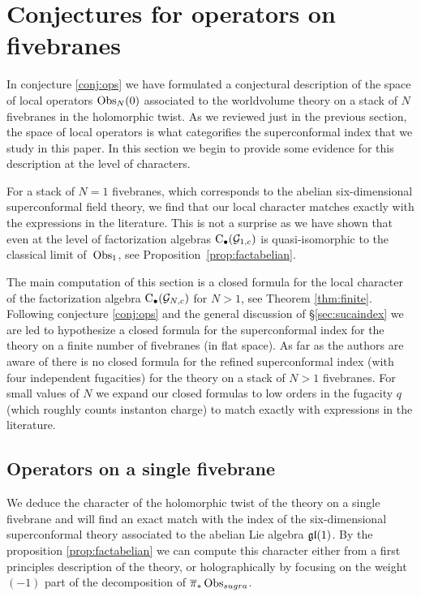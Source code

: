 \section{Conjectures for operators on fivebranes}
\label{s:finite}

In conjecture \ref{conj:ops} we have formulated a conjectural description of the space of local operators $\operatorname{Obs}_{N}(0)$ associated to the worldvolume theory on a stack of $N$ fivebranes in the holomorphic twist.
As we reviewed just in the previous section, the space of local operators is what categorifies the superconformal index that we study in this paper.
In this section we begin to provide some evidence for this description at the level of characters.


For a stack of $N=1$ fivebranes, which corresponds to the abelian six-dimensional superconformal field theory, we find that our local character matches exactly with the expressions in the literature. 
This is not a surprise as we have shown that even at the level of factorization algebras ${\rm C}_\bullet(\mathcal G_{1,c})$ is quasi-isomorphic to the classical limit of~$\operatorname{Obs}_1$, see Proposition~\ref{prop:factabelian}.

The main computation of this section is a closed formula for the local character of the factorization algebra ${\rm C}_\bullet(\mathcal G_{N,c})$ for $N > 1$, see Theorem \ref{thm:finite}. 
Following conjecture \ref{conj:ops} and the general discussion of \S \ref{sec:sucaindex} we are led to hypothesize a closed formula for the superconformal index for the theory on a finite number of fivebranes (in flat space).
As far as the authors are aware of there is no closed formula for the refined superconformal index (with four independent fugacities) for the theory on a stack of $N > 1$ fivebranes.
For small values of $N$ we expand our closed formulas to low orders in the fugacity $q$ (which roughly counts instanton charge) to match exactly with expressions in the literature. 

\subsection{Operators on a single fivebrane}

We deduce the character of the holomorphic twist of the theory on a single fivebrane and will find an exact match with the index of the six-dimensional superconformal theory associated to the abelian Lie algebra $\mathfrak{gl}(1)$.
By the proposition \ref{prop:factabelian} we can compute this character either from a first principles description of the theory, or holographically by focusing on the weight $(-1)$ part of the decomposition of $\overline{\pi}_* \operatorname{Obs}_{sugra}$.

